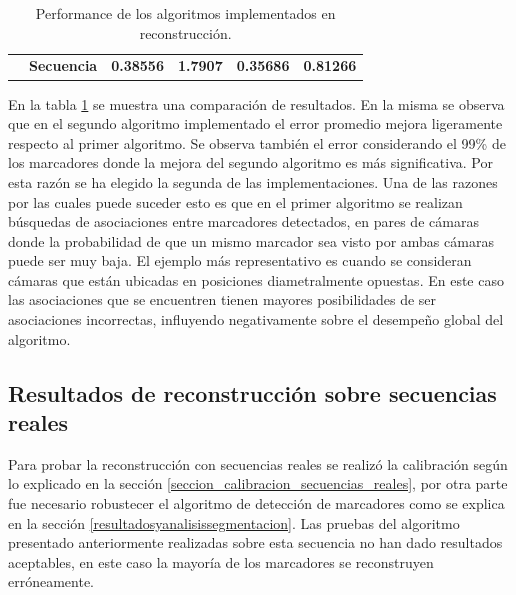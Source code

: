 \begin{table}[h]
\begin{tabular}{cc|c|c|c|c|}
\multicolumn{1}{l|}{}                                                         & \textbf{Secuencia }                                            & \textbf{0.38556 }                                                         & \textbf{1.7907    }                                                    & \textbf{0.35686}                                                         &\textbf{ 0.81266}                                                       \\ \cline{2-6} 
\end{tabular}
\caption{Performance de los algoritmos implementados en reconstrucción. }
\label{table_performance_reconstruccion}
\end{table}

En la tabla \ref{table_performance_reconstruccion} se muestra una comparación de resultados. En la misma se observa que en el segundo algoritmo implementado el error promedio mejora ligeramente respecto al primer algoritmo. Se observa también el error considerando el 99\% de los marcadores donde la mejora del segundo algoritmo es más significativa. Por esta razón se ha elegido la segunda de las implementaciones.
Una de las razones por las cuales puede suceder esto es que en el primer algoritmo se realizan búsquedas de asociaciones entre marcadores detectados, en pares de cámaras donde la probabilidad de que un mismo marcador sea visto por ambas cámaras puede ser muy baja. El ejemplo más representativo es cuando se consideran cámaras que están  ubicadas en posiciones diametralmente opuestas. En este caso las asociaciones que se encuentren tienen mayores posibilidades de ser asociaciones incorrectas, influyendo negativamente sobre el desempeño global del algoritmo. 



\subsection{Resultados de reconstrucción sobre secuencias reales}

Para probar la reconstrucción con secuencias reales se realizó la calibración según lo explicado en la sección \ref{seccion_calibracion_secuencias_reales}, por otra parte fue necesario robustecer el algoritmo de detección de marcadores como se explica en la sección \ref{resultadosyanalisissegmentacion}. Las pruebas del algoritmo presentado anteriormente realizadas sobre esta secuencia no han dado resultados aceptables, en este caso la mayoría de los marcadores se reconstruyen erróneamente. 


